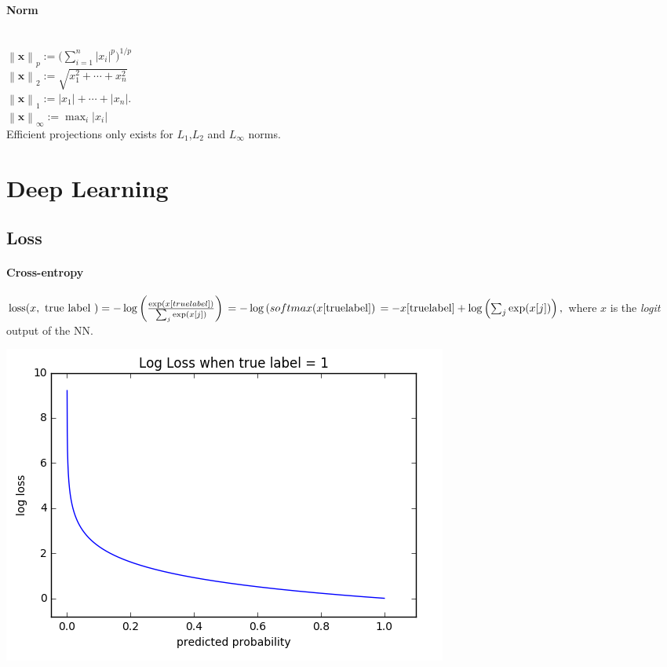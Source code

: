 \documentclass[11pt]{extarticle}
\newcommand\tab[1][0.25cm]{\hspace*{#1}}
\begin{document}
\begin{multicols*}{3}
       \paragraph{Norm}\tab\\
       $\left\|\mathbf {x} \right\|_{p}:={\bigg (}\sum _{i=1}^{n}\left|x_{i}\right|^{p}{\bigg )}^{1/p}$ \\
       $\left\|{\boldsymbol {x}}\right\|_{2}:={\sqrt {x_{1}^{2}+\cdots +x_{n}^{2}}}$\\
       $\left\|{\boldsymbol {x}}\right\|_{1}:={\left|x_{1}\right|+\cdots +\left|x_{n}\right|}.$ \\
       $\left\|\mathbf {x} \right\|_{\infty }:=\max _{i}\left|x_{i}\right|$ \\
       Efficient projections only exists for $L_1$,$L_2$ and $L_\infty$ norms.
       
		\section{Deep Learning}
		\subsection*{Loss}
		\paragraph{Cross-entropy}\tab $  \operatorname { loss } ( x , \text { true label } ) = - \log \left( \frac { \exp ( x [ true label ] ) } { \sum _ { j } \exp ( x [ j ] ) } \right) \\
		= - \log \left(softmax(x [ \operatorname { true label }] \right) \\
		= - x [ \operatorname { true label } ] + \log \left( \sum _ { j } \exp ( x [ j ] ) \right) \text{,}$ where $x$ is the \textit{logit} output of the NN.
		
        \includegraphics[width=\linewidth]{cross_entropy.png}
        

\end{multicols*}
\end{document}
